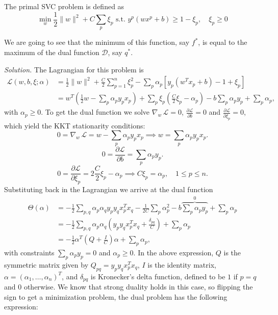 \documentclass[11pt,table]{article}
\newcommand\norm[1]{\lVert#1\rVert}
\begin{document}
The primal SVC problem is defined as
\[
	\min_w \frac{1}{2}\norm{w}^2 + C \sum_p \xi_p \text{ s.t. } y^p(wx^p + b) \geq 1 - \xi_p,\quad \xi_p \geq 0
\]

We are going to see that the minimum of this function, say \(f^*\), is equal to the maximum of the dual function \(\mathcal D\), say \(q^*\).


\textit{Solution.} The Lagrangian for this problem is
\begin{align*}
	\mathcal L(w, b, \xi; \alpha) & =\frac{1}{2}\|w\|^2 + \frac{C}{2}\sum_{p=1}^n \xi_p^2 - \sum_{p} \alpha_p[y_p(w^Tx_p+b)-1+\xi_p]                                                         \\
	                              & = w^T\left(\frac{1}{2}w - \sum_p \alpha_p y_px_p\right) + \sum_p \xi_p\left(\frac{C}{2}\xi_p - \alpha_p\right) - b\sum_p \alpha_p y_p + \sum_p \alpha_p,
\end{align*}
with $\alpha_p\geq 0$. To get the dual function we solve $\nabla_w\, \mathcal L = 0$, $\frac{\partial \mathcal L}{\partial b}=0$ and $\frac{\partial \mathcal L}{\partial \xi_p}=0$, which yield the KKT stationarity conditions:
\begin{equation}
	\label{eq:kkt1}
	0=\nabla_w\, \mathcal L = w - \sum_p \alpha_p y_px_p \implies w = \sum_p \alpha_p y_px_p.
\end{equation}
\begin{equation}
	\label{eq:kkt2}
	0=\frac{\partial \mathcal L}{\partial b} = \sum_{p} \alpha_p y_p.
\end{equation}
\begin{equation}
	\label{eq:kkt3}
	0=\frac{\partial \mathcal L}{\partial \xi_p} = 2\frac{C}{2}\xi_p - \alpha_p \implies C\xi_p = \alpha_p, \quad 1\leq p \leq n.
\end{equation}
Substituting back in the Lagrangian we arrive at the dual function
\begin{align*}
	\Theta(\alpha) & = -\frac{1}{2} \sum_{p, q}\alpha_p \alpha_q y_p y_q x_p^T x_q - \frac{1}{2C}\sum_p \alpha_p^2 - b \overbrace{\sum_p \alpha_py_p}^{0} + \sum_p \alpha_p \\
	               & = -\frac{1}{2} \sum_{p, q}\alpha_p \alpha_q  \left(y_p y_qx_p^T x_q + \frac{\delta_{pq}}{C}\right) + \sum_p \alpha_p                                   \\
	               & = -\frac{1}{2}\alpha^T\left(Q+ \frac{I}{C}\right)\alpha + \sum_p \alpha_p,
\end{align*}
with constraints $\sum_p \alpha_p y_p=0$ and $\alpha_p\geq 0$. In the above expression, $Q$ is the symmetric matrix given by $Q_{pq}=y_py_qx_p^Tx_q$, $I$ is the identity matrix, $\alpha=(\alpha_1,\dots,\alpha_n)^T$, and $\delta_{pq}$ is Kronecker's delta function, defined to be $1$ if $p=q$ and $0$ otherwise. We know that strong duality holds in this case, so flipping the sign to get a minimization problem, the dual problem has the following expression:
\end{document}
